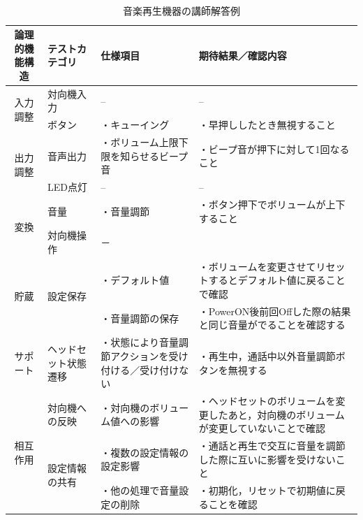 \begin{table}[htbp]
　\footnotesize
  \centering
  \caption{音楽再生機器の講師解答例}
    \begin{tabular}{|c|l|p{11em}|p{11em}|}
    \hline
    \multicolumn{1}{|p{7em}|}{{論理的機能構造}} & \multicolumn{1}{p{8em}|}{{テストカテゴリ}} & {仕様項目} & {期待結果／確認内容} \bigstrut\\
    \hline
    \hline
    \multicolumn{1}{|c|}{\multirow{2}[4]{*}{{入力調整}}} & \multicolumn{1}{p{7.75em}|}{{対向機入力}} & {--} & {--} \bigstrut\\
\cline{2-4}          & \multicolumn{1}{p{7.75em}|}{{ボタン}} & {・キューイング} & {・早押ししたとき無視すること} \bigstrut\\
    \hline
    \multicolumn{1}{|c|}{\multirow{2}[4]{*}{{出力調整}}} & \multicolumn{1}{p{7.75em}|}{{音声出力}} & {・ボリューム上限下限を知らせるビープ音} & {・ビープ音が押下に対して1回なること} \bigstrut\\
\cline{2-4}          & \multicolumn{1}{p{7.75em}|}{{LED点灯}} & {--} & {--} \bigstrut\\
    \hline
    \multicolumn{1}{|c|}{\multirow{2}[4]{*}{{変換}}} & \multicolumn{1}{p{7.75em}|}{{音量}} & {・音量調節} & {・ボタン押下でボリュームが上下すること} \bigstrut\\
\cline{2-4}          & \multicolumn{1}{p{7.75em}|}{{対向機操作}} & {－} & \multicolumn{1}{r|}{} \bigstrut\\
    \hline
    \multicolumn{1}{|c|}{\multirow{2}[2]{*}{{貯蔵}}} & \multicolumn{1}{l|}{\multirow{2}[2]{*}{{設定保存}}} & {・デフォルト値} & {・ボリュームを変更させてリセットするとデフォルト値に戻ることで確認} \bigstrut[t]\\
          &       & {・音量調節の保存} & {・PowerON後前回Offした際の結果と同じ音量がでることを確認する} \bigstrut[b]\\
    \hline
    \multicolumn{1}{|p{5.835em}|}{{サポート}} & \multicolumn{1}{p{7.75em}|}{{ヘッドセット状態遷移}} & {・状態により音量調節アクションを受け付ける／受け付けない} & {・再生中，通話中以外音量調節ボタンを無視する} \bigstrut\\
    \hline
    \multicolumn{1}{|c|}{\multirow{3}[4]{*}{{相互作用}}} & \multicolumn{1}{p{7.75em}|}{{対向機への反映}} & {・対向機のボリューム値への影響} & {・ヘッドセットのボリュームを変更したあと，対向機のボリュームが変更していないことで確認} \bigstrut\\
\cline{2-4}          & \multicolumn{1}{l|}{\multirow{2}[2]{*}{{設定情報の共有}}} & {・複数の設定情報の設定影響} & {・通話と再生で交互に音量を調節した際に互いに影響を受けないこと} \bigstrut[t]\\
          &       & {・他の処理で音量設定の削除} & {・初期化，リセットで初期値に戻ることを確認} \bigstrut[b]\\
    \hline
    \end{tabular}%
  \label{tab:D-3-ensyu1}%
\end{table}%



